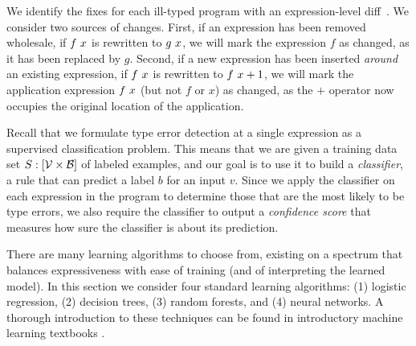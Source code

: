 We identify the fixes for each ill-typed program with an
expression-level diff~\citep{Lempsink2009-xf}.
%
We consider two sources of changes.
%
First, if an expression has been removed wholesale, \eg if $f\ x$
  is rewritten to $g\ x$, we will mark the expression $f$ as
  changed, as it has been replaced by $g$.
Second, if a new expression has been inserted \emph{around} an existing
  expression, \eg if $f\ x$ is rewritten to
  $f\ x + 1$, we will mark the application expression
  $f\ x$ (but not $f$ or $x$) as changed, as the $+$ operator now
  occupies the original location of the application.

\label{sec:nate:models}
\lstDeleteShortInline{|} %

Recall that we formulate type error detection at a single expression as
a supervised classification problem.
%
This means that we are given a training data set
$S : [\mathcal{V} \times \mathcal{B}]$
of labeled examples, and
our goal is to use it to build a \emph{classifier}, \ie a rule
that can predict a label $b$ for an input $v$.
%
Since we apply the classifier on each expression in the program to
determine those that are the most likely to be type errors, we also
require the classifier to output a \emph{confidence score} that measures
how sure the classifier is about its prediction.


%
%

There are many learning algorithms to choose from, existing on a
spectrum that balances expressiveness with ease of training (and of
interpreting the learned model).
%
In this section we consider four standard learning algorithms: (1)
logistic regression, (2) decision trees, (3) random forests, and (4)
neural networks.
%
A thorough introduction to these techniques can be found in introductory
machine learning textbooks \citep[\eg][]{Hastie2009-bn}.
%

